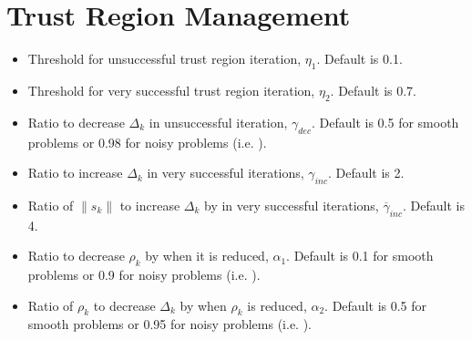 \documentclass[letterpaper,10pt,english]{sphinxmanual}
\begin{document}
\section{Trust Region Management}
\label{\detokenize{advanced:trust-region-management}}\begin{itemize}
\item {} 
 \sphinxhyphen{} Threshold for unsuccessful trust region iteration, \(\eta_1\). Default is 0.1.

\item {} 
 \sphinxhyphen{} Threshold for very successful trust region iteration, \(\eta_2\). Default is 0.7.

\item {} 
 \sphinxhyphen{} Ratio to decrease \(\Delta_k\) in unsuccessful iteration, \(\gamma_{dec}\). Default is 0.5 for smooth problems or 0.98 for noisy problems (i.e. ).

\item {} 
 \sphinxhyphen{} Ratio to increase \(\Delta_k\) in very successful iterations, \(\gamma_{inc}\). Default is 2.

\item {} 
 \sphinxhyphen{} Ratio of \(\|s_k\|\) to increase \(\Delta_k\) by in very successful iterations, \(\overline{\gamma}_{inc}\). Default is 4.

\item {} 
 \sphinxhyphen{} Ratio to decrease \(\rho_k\) by when it is reduced, \(\alpha_1\). Default is 0.1 for smooth problems or 0.9 for noisy problems (i.e. ).

\item {} 
 \sphinxhyphen{} Ratio of \(\rho_k\) to decrease \(\Delta_k\) by when \(\rho_k\) is reduced, \(\alpha_2\). Default is 0.5 for smooth problems or 0.95 for noisy problems (i.e. ).

\end{itemize}
\end{document}
